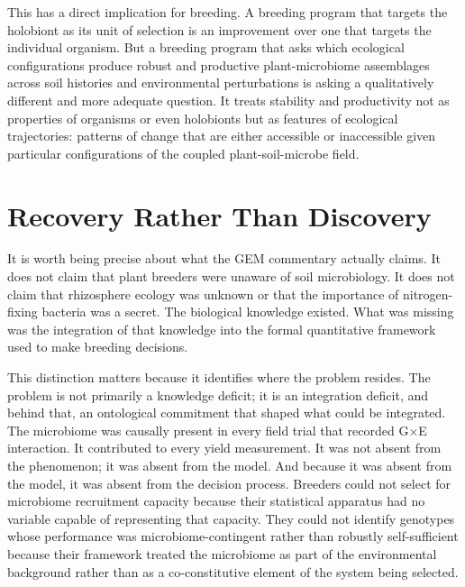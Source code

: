 \documentclass[11pt, a4paper]{article}
\begin{document}
This has a direct implication for breeding. A breeding program that targets the holobiont as its unit of selection is an improvement over one that targets the individual organism. But a breeding program that asks which ecological configurations produce robust and productive plant-microbiome assemblages across soil histories and environmental perturbations is asking a qualitatively different and more adequate question. It treats stability and productivity not as properties of organisms or even holobionts but as features of ecological trajectories: patterns of change that are either accessible or inaccessible given particular configurations of the coupled plant-soil-microbe field.

\section{Recovery Rather Than Discovery}

It is worth being precise about what the GEM commentary actually claims. It does not claim that plant breeders were unaware of soil microbiology. It does not claim that rhizosphere ecology was unknown or that the importance of nitrogen-fixing bacteria was a secret. The biological knowledge existed. What was missing was the integration of that knowledge into the formal quantitative framework used to make breeding decisions.

This distinction matters because it identifies where the problem resides. The problem is not primarily a knowledge deficit; it is an integration deficit, and behind that, an ontological commitment that shaped what could be integrated. The microbiome was causally present in every field trial that recorded G$\times$E interaction. It contributed to every yield measurement. It was not absent from the phenomenon; it was absent from the model. And because it was absent from the model, it was absent from the decision process. Breeders could not select for microbiome recruitment capacity because their statistical apparatus had no variable capable of representing that capacity. They could not identify genotypes whose performance was microbiome-contingent rather than robustly self-sufficient because their framework treated the microbiome as part of the environmental background rather than as a co-constitutive element of the system being selected.
\end{document}
